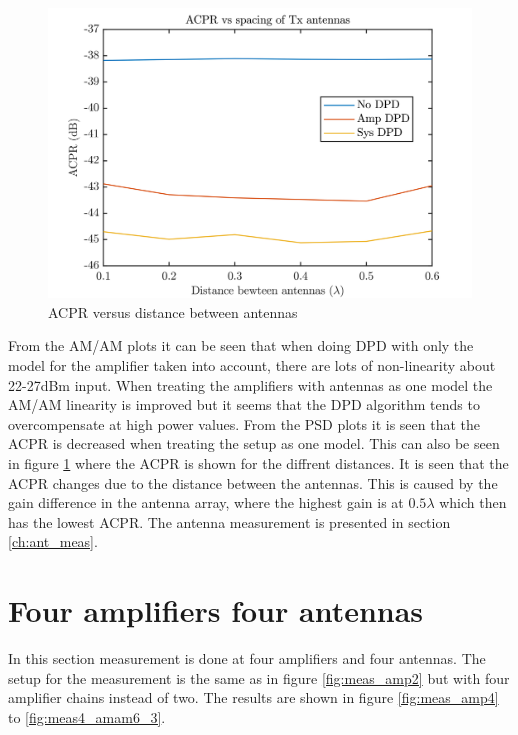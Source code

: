 \begin{figure}[H]
\centering 
\includegraphics[scale = 0.6]{figures/measurement/cree/meas3/acpr_two_ant.png}
\caption{ACPR versus distance between antennas}
\label{fig:meas2_dpd}
\end{figure}

From the AM/AM plots it can be seen that when doing DPD with only the model for the amplifier taken into account,  there are lots of non-linearity about 22-27dBm input. When treating the amplifiers with antennas as one model the AM/AM linearity is improved but it seems that the DPD algorithm tends to overcompensate at high power values. From the PSD plots it is seen that the ACPR is decreased when treating the setup as one model. This can also be seen in figure \ref{fig:meas2_dpd} where the ACPR is shown for the diffrent distances. It is seen that the ACPR changes due to the distance between the antennas. This is caused by the gain difference in the antenna array, where the highest gain is at $0.5\lambda$ which then has the lowest ACPR. The antenna measurement is presented in section \ref{ch:ant_meas}.    





\section{Four amplifiers four antennas}

In this section measurement is done at four amplifiers and four antennas. The setup for the measurement is the same as in figure \ref{fig:meas_amp2} but with four amplifier chains instead of two. The results are shown in figure \ref{fig:meas_amp4} to \ref{fig:meas4_amam6_3}.

